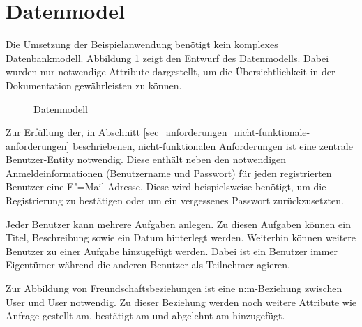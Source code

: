 \section{Datenmodel}
\label{sec_konzeption_datamodel}

Die Umsetzung der Beispielanwendung benötigt kein komplexes Datenbankmodell. Abbildung \ref{image_konzeption_datenmodell} zeigt den Entwurf des Datenmodells. Dabei wurden nur notwendige Attribute dargestellt, um die Übersichtlichkeit in der Dokumentation gewährleisten zu können. \\

\begin{figure}[htp] 
\caption{Datenmodell}
\label{image_konzeption_datenmodell}
\end{figure} 

Zur Erfüllung der, in Abschnitt \ref{sec_anforderungen_nicht-funktionale-anforderungen} beschriebenen, nicht-funktionalen Anforderungen ist eine zentrale Benutzer-Entity notwendig. Diese enthält neben den notwendigen Anmeldeinformationen (Benutzername und Passwort) für jeden registrierten Benutzer eine E"=Mail Adresse. Diese wird beispielsweise benötigt, um die Registrierung zu bestätigen oder um ein vergessenes Passwort zurückzusetzten. 

Jeder Benutzer kann mehrere Aufgaben anlegen. Zu diesen Aufgaben können ein Titel, Beschreibung sowie ein Datum hinterlegt werden. Weiterhin können weitere Benutzer zu einer Aufgabe hinzugefügt werden. Dabei ist ein Benutzer immer \glqq{}Eigentümer\grqq{} während die anderen Benutzer als \glqq{}Teilnehmer\grqq{} agieren.

Zur Abbildung von Freundschaftsbeziehungen ist eine n:m-Beziehung zwischen User und User notwendig. Zu dieser Beziehung werden noch weitere Attribute wie \glqq{}Anfrage gestellt am\grqq{}, \glqq{}bestätigt am\grqq{} und \glqq{}abgelehnt am\grqq{} hinzugefügt.


